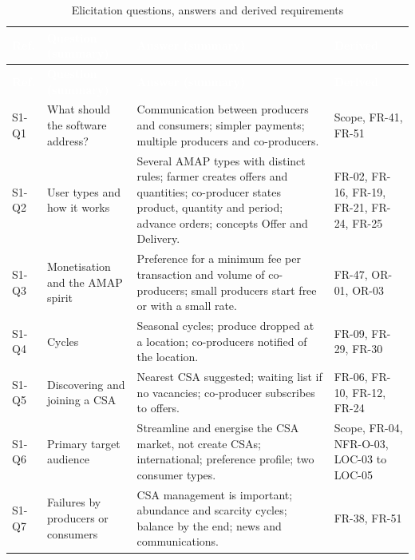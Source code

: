 \documentclass[11pt,a4paper]{article}
\begin{document}
{\footnotesize
\begin{longtable}{>{\raggedright\arraybackslash\hspace{0pt}}p{}>{\raggedright\arraybackslash\hspace{0pt}}p{}>{\raggedright\arraybackslash\hspace{0pt}}p{}>{\raggedright\arraybackslash\hspace{0pt}}p{}}
\caption{Elicitation questions, answers and derived requirements}\label{tab:elicitation}\\
\rowcolor{hdr}\textcolor{white}{\textbf{Ref.}} & \textcolor{white}{\textbf{Question (summary)}} & \textcolor{white}{\textbf{Answer (summary)}} & \textcolor{white}{\textbf{Derived}} \\ \endfirsthead
\rowcolor{hdr}\textcolor{white}{\textbf{Ref.}} & \textcolor{white}{\textbf{Question (summary)}} & \textcolor{white}{\textbf{Answer (summary)}} & \textcolor{white}{\textbf{Derived}} \\ \endhead
S1-Q1 & What should the software address? & Communication between producers and consumers; simpler payments; multiple producers and co-producers. & Scope, FR-41, FR-51 \\ \hline
S1-Q2 & User types and how it works & Several AMAP types with distinct rules; farmer creates offers and quantities; co-producer states product, quantity and period; advance orders; concepts Offer and Delivery. & FR-02, FR-16, FR-19, FR-21, FR-24, FR-25 \\ \hline
S1-Q3 & Monetisation and the AMAP spirit & Preference for a minimum fee per transaction and volume of co-producers; small producers start free or with a small rate. & FR-47, OR-01, OR-03 \\ \hline
S1-Q4 & Cycles & Seasonal cycles; produce dropped at a location; co-producers notified of the location. & FR-09, FR-29, FR-30 \\ \hline
S1-Q5 & Discovering and joining a CSA & Nearest CSA suggested; waiting list if no vacancies; co-producer subscribes to offers. & FR-06, FR-10, FR-12, FR-24 \\ \hline
S1-Q6 & Primary target audience & Streamline and energise the CSA market, not create CSAs; international; preference profile; two consumer types. & Scope, FR-04, NFR-O-03, LOC-03 to LOC-05 \\ \hline
S1-Q7 & Failures by producers or consumers & CSA management is important; abundance and scarcity cycles; balance by the end; news and communications. & FR-38, FR-51 \\ \hline

\end{longtable}}
\end{document}
